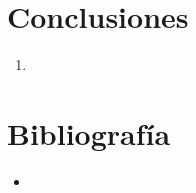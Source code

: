 \documentclass[12pt]{article}
\begin{document}
                \subsection{}
                \subsection{}
                \subsection{}
                

        \newpage
        \section{Conclusiones}
                \begin{enumerate}
                        \item 
                \end{enumerate}

        \newpage
        \section{Bibliografía}
        \begin{itemize}
                \item 
        \end{itemize}
            
\end{document}
